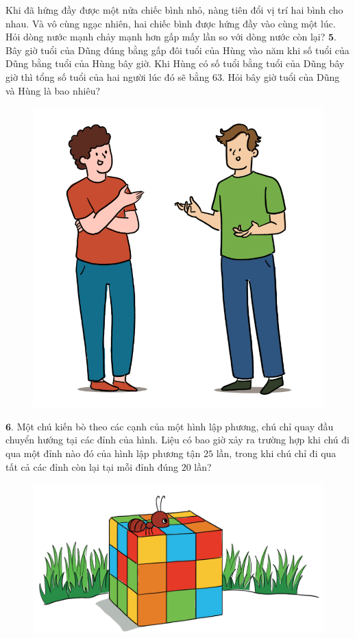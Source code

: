 \begin{multicols}{2}
\begin{figure}[H]
		\vspace*{-15pt}
	\end{figure}
	 Khi đã hứng đầy được một nửa chiếc bình nhỏ, nàng tiên đổi vị trí hai bình cho nhau. Và vô cùng ngạc nhiên, hai chiếc bình được hứng đầy vào cùng một lúc. Hỏi  dòng nước mạnh chảy mạnh hơn gấp mấy lần so với dòng nước còn lại?
	 \vskip 0.2cm
	$\pmb{5.}$ Bây giờ tuổi của Dũng đúng bằng gấp đôi tuổi của Hùng vào năm khi số tuổi của Dũng bằng tuổi của Hùng bây giờ. Khi Hùng có số tuổi bằng tuổi của Dũng bây giờ thì tổng số tuổi của hai người lúc đó sẽ bằng $63$. Hỏi bây giờ tuổi của Dũng và Hùng là bao nhiêu?
	\begin{figure}[H]
		\centering
		\vspace*{-5pt}
		\captionsetup{labelformat= empty, justification=centering}
		\includegraphics[width=0.75\linewidth]{Pi10_bai5}
		\vspace*{-5pt}
	\end{figure}
	$\pmb{6.}$ Một chú kiến bò theo các cạnh của một hình  lập phương, chú chỉ quay đầu chuyển hướng tại các đỉnh của hình. Liệu có bao giờ xảy ra trường hợp khi chú đi qua một đỉnh nào đó của hình lập phương tận $25$ lần, trong khi chú chỉ đi qua tất cả các đỉnh còn lại tại mỗi đỉnh đúng $20$ lần?
	\begin{figure}[H]
		\centering
		\vspace*{-5pt}
		\captionsetup{labelformat= empty, justification=centering}
		\includegraphics[width=1\linewidth]{Pi10_bai6}
		\vspace*{-5pt}
	\end{figure}
\end{multicols}
